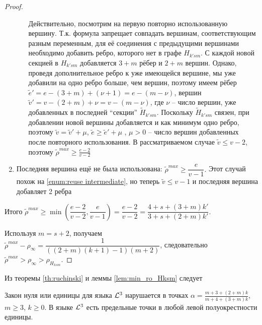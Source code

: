 \begin{proof}
\begin{enumerate}
\begin{enumerate}
\begin{figure}
  \label{fig:reuse intermediate}
\end{figure}
\label{enum:reuse intermediate}
Действительно, посмотрим на первую повторно использованную вершину.
Т.к. формула запрещает совпадать вершинам, соответствующим разным переменным, для её соединения с предыдущими вершинами необходимо добавить ребро, которого нет в графе $H_{k'sm}$. 
С каждой новой секцией в $H_{k'sm}$ добавляется $3+m$ рёбер  и $2+m$ вершин.
Однако, проведя дополнительное ребро к уже имеющейся вершине, мы уже добавили на одно ребро больше, чем вершин, поэтому имеем рёбер $ \tilde e' = e - (3+m) + (\nu+1) = e - (m-\nu) $, вершин $\tilde v' = v - (2+m) + \nu = v - (m-\nu)$, где $\nu$ -- число вершин, уже добавленных в последней ``секции'' $\tilde H_{k'sm}$.
Поскольку $\tilde H_{k'sm}$ связен, при добавлении новой вершины добавляется и как минимум одно ребро, поэтому $\tilde v = \tilde v' + \mu$, $\tilde e \geq \tilde e' + \mu $ , $\mu > 0$ -- число вершин добавленных после повторного использования.
В рассматриваемом случае $\tilde v \leq v-2$, поэтому $\tilde \rho^{max} \geq \frac{e-2}{v-2}$ 
\end{enumerate}
\item
Последняя вершина ещё не была использована:
$\tilde \rho^{max} \geq \dfrac{e}{v-1}.$
Этот случай похож на \ref{enum:reuse intermediate}, но теперь $\tilde v \leq v-1$ и последняя вершина добавляет 2 ребра
\end{enumerate}

Итого 
$\tilde \rho^{max} \geq \min(\dfrac{e-2}{v-2}, \dfrac{e}{v-1}) = \dfrac{e-2}{v-2} = \dfrac{4+s +(3+m)k'}{3+s + (2+m)k'}$. 

Используя $m=s+2$, получаем $\tilde \rho^{max} - \rho_\infty = \dfrac{1}{((2+m)(k+1)-1)(m+2)}$, следовательно
$\tilde \rho^{max} > \rho_\infty > \rho_{H_{ksm}} $.
\end{proof}

Из теоремы \ref{th:ruchinski} и леммы \ref{lem:min_ro_Hksm} следует

\begin{theorem}
 Закон нуля или единицы для языка $\mathcal{L}^3$ нарушается в точках $\alpha = \frac{m+3 + (2+m)k}{m+4 + (3+m)k}$, $m \geq 3$, $k \geq 0$.
В языке $\mathcal{L}^3$ есть предельные точки в любой левой полуокрестности единицы.
\end{theorem}